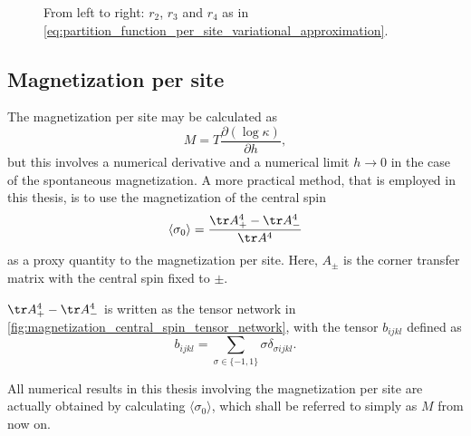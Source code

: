 \begin{figure}
  \begin{subfigure}{.33\linewidth}
    
  \end{subfigure}%
  \begin{subfigure}{.33\linewidth}
    
  \end{subfigure}
  \begin{subfigure}{.33\linewidth}
    
  \end{subfigure}
  \caption{From left to right:
  $r_2$, $r_3$ and $r_4$ as in
  \autoref{eq:partition_function_per_site_variational_approximation}.}
  \label{fig:partition_function_per_site_tensor_networks}
\end{figure}


\subsection{Magnetization per site}\label{sec:magnetization_per_site}
The magnetization per site may be calculated as
\begin{equation}
  M = T \frac{\partial (\log \kappa)}{\partial h},
\end{equation}
but this involves a numerical derivative and a numerical limit $h \to 0$ in the case of the spontaneous magnetization.
A more practical method, that is employed in this thesis, is to use the magnetization of the central spin
\begin{equation}
  \langle \sigma_0 \rangle = \frac{\tr A_{+}^4 - \tr A_{-}^4}{\tr A^4}
\end{equation}
as a proxy quantity to the magnetization per site.
Here, $A_{\pm}$ is the corner transfer matrix with the central spin fixed to $\pm$.

$\tr A_{+}^4 - \tr A_{-}^4$ is written as the tensor network in \autoref{fig:magnetization_central_spin_tensor_network},
with the tensor $b_{i j k l}$ defined as
\begin{equation}\label{eq:b_tensor}
  b_{i j k l} = \sum_{\sigma \in \{ -1, 1 \} } \sigma \delta_{\sigma i j k l}.
\end{equation}

All numerical results in this thesis involving the magnetization per site are actually obtained by calculating $\langle
\sigma_0 \rangle$, which shall be referred to simply as $M$ from now on.

